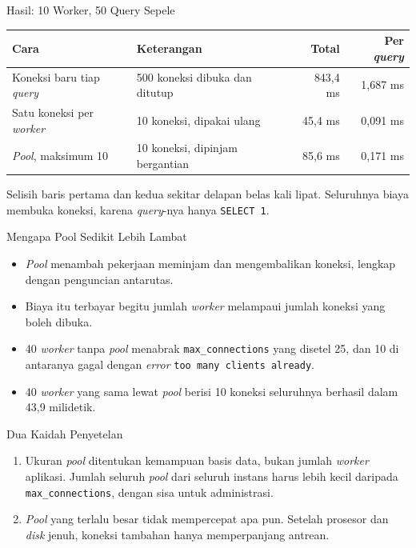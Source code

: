 \documentclass[aspectratio=169, table, 12pt]{beamer}
\begin{document}
\begin{frame}{{\Large Hasil: 10 Worker, 50 Query Sepele}}
  \vspace{5pt}
  {\centering
  {\small
  \begin{tabularx}{\textwidth}{lXrr}
    \hline
    \textbf{Cara} & \textbf{Keterangan} & \textbf{Total} & \textbf{Per \textit{query}} \\
    \hline
    Koneksi baru tiap \textit{query} & 500 koneksi dibuka dan ditutup & 843,4 ms & 1,687 ms \\
    \hline
    Satu koneksi per \textit{worker} & 10 koneksi, dipakai ulang & 45,4 ms & 0,091 ms \\
    \hline
    \textit{Pool}, maksimum 10 & 10 koneksi, dipinjam bergantian & 85,6 ms & 0,171 ms \\
    \hline
  \end{tabularx}}\par}

  \vspace{8pt}
  {\footnotesize Selisih baris pertama dan kedua sekitar delapan belas kali
  lipat. Seluruhnya biaya membuka koneksi, karena \textit{query}-nya hanya
  \texttt{SELECT 1}.}
\end{frame}

\begin{frame}{{\Large Mengapa Pool Sedikit Lebih Lambat}}
  \vspace{8pt}
  \begin{itemize}
    \item \textit{Pool} menambah pekerjaan meminjam dan mengembalikan koneksi,
          lengkap dengan penguncian antarutas.
    \item Biaya itu terbayar begitu jumlah \textit{worker} melampaui jumlah koneksi
          yang boleh dibuka.
    \item 40 \textit{worker} tanpa \textit{pool} menabrak \texttt{max\_connections} yang
          disetel 25, dan 10 di antaranya gagal dengan \textit{error} \texttt{too many
          clients already}.
    \item 40 \textit{worker} yang sama lewat \textit{pool} berisi 10 koneksi seluruhnya
          berhasil dalam 43,9 milidetik.
  \end{itemize}
\end{frame}

\begin{frame}{{\Large Dua Kaidah Penyetelan}}
  \vspace{8pt}
  \begin{enumerate}
    \item Ukuran \textit{pool} ditentukan kemampuan basis data, bukan jumlah \textit{worker}
          aplikasi. Jumlah seluruh \textit{pool} dari seluruh instans harus lebih
          kecil daripada \texttt{max\_connections}, dengan sisa untuk
          administrasi.
    \item \textit{Pool} yang terlalu besar tidak mempercepat apa pun. Setelah
          prosesor dan \textit{disk} jenuh, koneksi tambahan hanya memperpanjang
          antrean.
  \end{enumerate}
\end{frame}
\end{document}
